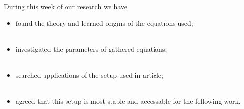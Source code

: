 

\begin{equation*}
	\phantom{239}
\end{equation*}

During this week of our research we have
\begin{itemize}
	\item found the theory and learned origins of the equations used;\\
	\phantom{239}\\
	\item investigated the parameters of gathered equations;\\
	\phantom{239}\\
	\item searched applications of the setup used in article;\\
	\phantom{239}\\
	\item agreed that this setup is most stable and accessable for the following work.
\end{itemize}